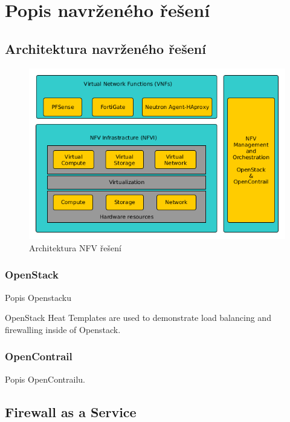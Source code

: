 \chapter{Popis navrženého řešení}


\section{Architektura navrženého řešení}


\begin{figure}[h]
\begin{centering}
\includegraphics[scale=0.51]{images/VNF_overview}
\par\end{centering}
\caption{Architektura NFV řešení\label{fig:VNF_overview}}
\end{figure}


\subsection{OpenStack}\label{sub:interaction}

Popis Openstacku

OpenStack Heat Templates are used to demonstrate load balancing and firewalling inside of Openstack.

\subsection{OpenContrail}\label{sub:interaction}

Popis OpenContrailu.


\section{Firewall as a Service}


